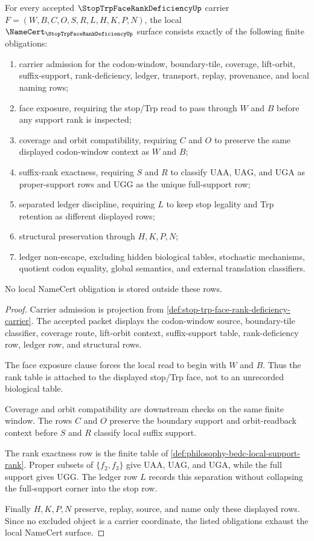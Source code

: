 \begin{theorem}
\label{thm:stop-trp-face-rank-deficiency-namecert-obligations}
For every accepted $\StopTrpFaceRankDeficiencyUp$ carrier
$F=(W,B,C,O,S,R,L,H,K,P,N)$, the local
$\NameCert_{\StopTrpFaceRankDeficiencyUp}$ surface consists exactly of the
following finite obligations:
\begin{enumerate}
\item carrier admission for the codon-window, boundary-tile, coverage,
lift-orbit, suffix-support, rank-deficiency, ledger, transport, replay,
provenance, and local naming rows;
\item face exposure, requiring the stop/Trp read to pass through $W$ and $B$
before any support rank is inspected;
\item coverage and orbit compatibility, requiring $C$ and $O$ to preserve the
same displayed codon-window context as $W$ and $B$;
\item suffix-rank exactness, requiring $S$ and $R$ to classify
$\mathrm{UAA}$, $\mathrm{UAG}$, and $\mathrm{UGA}$ as proper-support rows and
$\mathrm{UGG}$ as the unique full-support row;
\item separated ledger discipline, requiring $L$ to keep stop legality and
Trp retention as different displayed rows;
\item structural preservation through $H,K,P,N$;
\item ledger non-escape, excluding hidden biological tables, stochastic
mechanisms, quotient codon equality, global semantics, and external
translation classifiers.
\end{enumerate}
No local NameCert obligation is stored outside these rows.
\end{theorem}
\begin{proof}
Carrier admission is projection from
\autoref{def:stop-trp-face-rank-deficiency-carrier}. The accepted packet
displays the codon-window source, boundary-tile classifier, coverage route,
lift-orbit context, suffix-support table, rank-deficiency row, ledger row,
and structural rows.

The face exposure clause forces the local read to begin with $W$ and $B$.
Thus the rank table is attached to the displayed stop/Trp face, not to an
unrecorded biological table.

Coverage and orbit compatibility are downstream checks on the same finite
window. The rows $C$ and $O$ preserve the boundary support and orbit-readback
context before $S$ and $R$ classify local suffix support.

The rank exactness row is the finite table of
\autoref{def:philosophy-bedc-local-support-rank}. Proper subsets of
$\{f_2,f_3\}$ give $\mathrm{UAA}$, $\mathrm{UAG}$, and $\mathrm{UGA}$, while
the full support gives $\mathrm{UGG}$. The ledger row $L$ records this
separation without collapsing the full-support corner into the stop row.

Finally $H,K,P,N$ preserve, replay, source, and name only these displayed
rows. Since no excluded object is a carrier coordinate, the listed obligations
exhaust the local NameCert surface.
\end{proof}

